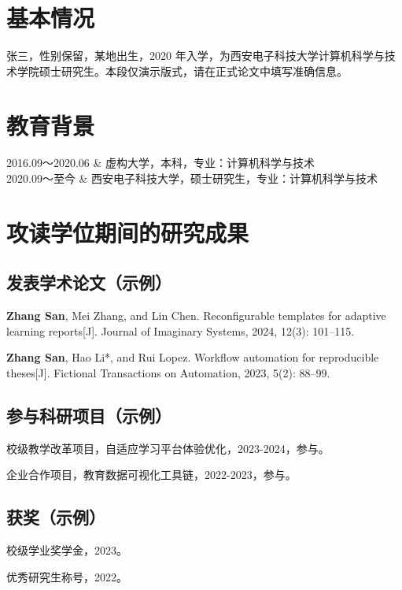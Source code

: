 \setcounter{section}{0}
\section{基本情况}
张三，性别保留，某地出生，2020 年入学，为西安电子科技大学计算机科学与技术学院硕士研究生。本段仅演示版式，请在正式论文中填写准确信息。

\section{教育背景}
\begin{edubg}
  2016.09～2020.06 & 虚构大学，本科，专业：计算机科学与技术 \\
  2020.09～至今 & 西安电子科技大学，硕士研究生，专业：计算机科学与技术 \\
\end{edubg}

\section{攻读学位期间的研究成果}
\subsection{发表学术论文（示例）}
\begin{resresult}
  \item \textbf{Zhang San}, Mei Zhang, and Lin Chen. Reconfigurable templates for adaptive learning reports[J]. Journal of Imaginary Systems, 2024, 12(3): 101--115.
  \item \textbf{Zhang San}, Hao Li*, and Rui Lopez. Workflow automation for reproducible theses[J]. Fictional Transactions on Automation, 2023, 5(2): 88--99.
\end{resresult}

\subsection{参与科研项目（示例）}
\begin{resresult}
  \item 校级教学改革项目，自适应学习平台体验优化，2023-2024，参与。
  \item 企业合作项目，教育数据可视化工具链，2022-2023，参与。
\end{resresult}

\subsection{获奖（示例）}
\begin{resresult}
  \item 校级学业奖学金，2023。
  \item 优秀研究生称号，2022。
\end{resresult}
